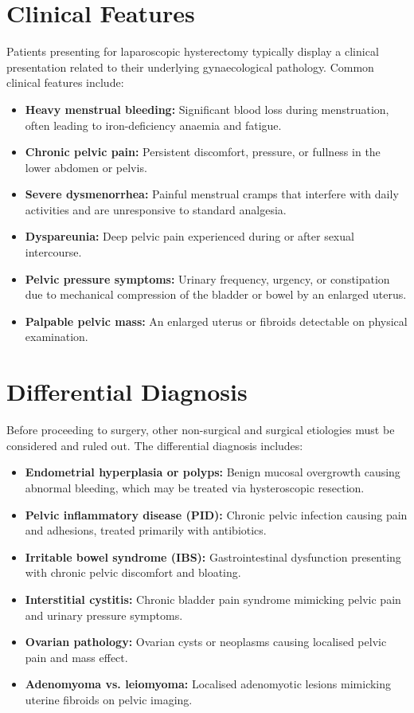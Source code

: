 \section*{Clinical Features}
Patients presenting for laparoscopic hysterectomy typically display a clinical presentation related to their underlying gynaecological pathology. Common clinical features include:
\begin{itemize}
    \item \textbf{Heavy menstrual bleeding:} Significant blood loss during menstruation, often leading to iron-deficiency anaemia and fatigue.
    \item \textbf{Chronic pelvic pain:} Persistent discomfort, pressure, or fullness in the lower abdomen or pelvis.
    \item \textbf{Severe dysmenorrhea:} Painful menstrual cramps that interfere with daily activities and are unresponsive to standard analgesia.
    \item \textbf{Dyspareunia:} Deep pelvic pain experienced during or after sexual intercourse.
    \item \textbf{Pelvic pressure symptoms:} Urinary frequency, urgency, or constipation due to mechanical compression of the bladder or bowel by an enlarged uterus.
    \item \textbf{Palpable pelvic mass:} An enlarged uterus or fibroids detectable on physical examination.
\end{itemize}

\section*{Differential Diagnosis}
Before proceeding to surgery, other non-surgical and surgical etiologies must be considered and ruled out. The differential diagnosis includes:
\begin{itemize}
    \item \textbf{Endometrial hyperplasia or polyps:} Benign mucosal overgrowth causing abnormal bleeding, which may be treated via hysteroscopic resection.
    \item \textbf{Pelvic inflammatory disease (PID):} Chronic pelvic infection causing pain and adhesions, treated primarily with antibiotics.
    \item \textbf{Irritable bowel syndrome (IBS):} Gastrointestinal dysfunction presenting with chronic pelvic discomfort and bloating.
    \item \textbf{Interstitial cystitis:} Chronic bladder pain syndrome mimicking pelvic pain and urinary pressure symptoms.
    \item \textbf{Ovarian pathology:} Ovarian cysts or neoplasms causing localised pelvic pain and mass effect.
    \item \textbf{Adenomyoma vs. leiomyoma:} Localised adenomyotic lesions mimicking uterine fibroids on pelvic imaging.
\end{itemize}

